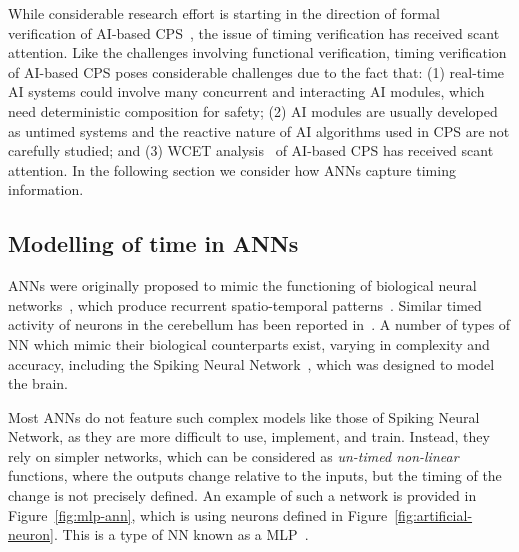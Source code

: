 While considerable research effort is starting in the direction of formal verification of \ac{AI}-based \ac{CPS}~\cite{seshia2016towards, russell2015},
 the issue of timing verification has received scant attention. 
Like the challenges involving functional verification, timing verification of AI-based  \ac{CPS} poses considerable 
challenges due to the fact that: (1) real-time \ac{AI} systems could involve many concurrent and interacting \ac{AI} modules, which need 
deterministic composition for safety; (2) \ac{AI} modules are usually developed as untimed systems and the reactive nature of 
AI algorithms used in CPS are not carefully studied; and (3) \acf{WCET} analysis~\cite{wilhelm2008worst} of \ac{AI}-based \ac{CPS} has received scant attention.
 In the following section we 
 consider how \acp{ANN} capture timing information.


\subsection{ Modelling of time in \acp{ANN}}
\label{ANN-review}

\acp{ANN} were originally proposed to mimic the functioning of  biological neural networks~\cite{kohonen1988introduction}, which produce recurrent spatio-temporal patterns~\cite{rolston2007precisely}. 
Similar timed activity of neurons in the cerebellum has been reported in~\cite{bullock1994neural, moore1989adaptively}. 
A number of types of \ac{NN} which mimic their biological counterparts exist, varying in complexity and accuracy, including the Spiking Neural Network~\cite{izhikevich2003spiking,maass1997spiking}, which was designed to model the brain. %

Most \acp{ANN} do not feature such complex models like those of Spiking Neural Network, as they are more difficult to use, implement, and train. 
Instead, they rely on simpler networks, which can be considered as \emph{un-timed non-linear} functions, 
where the outputs change relative to the inputs, but the timing of the change is not precisely defined. 
An example of such a network is provided in Figure~\ref{fig:mlp-ann}, which is using neurons defined in Figure~\ref{fig:artificial-neuron}. 
This is a type of \ac{NN} known as a \acf{MLP}~\cite{yegnanarayana1994artificial}.



